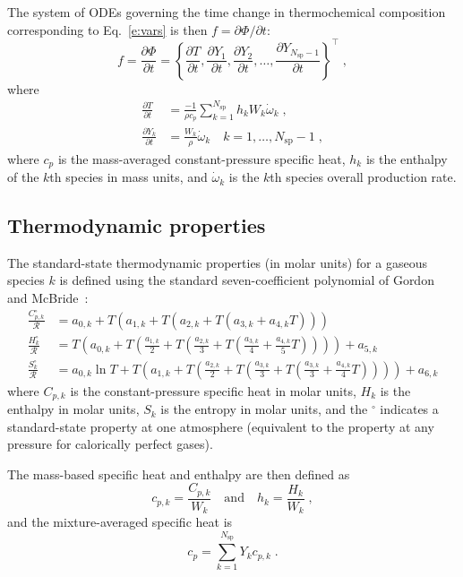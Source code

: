 \documentclass[preprint,12pt]{elsarticle}
\newcommand{ \ddt } [1] { \frac{ \partial #1 }{ \partial t } }
\newcommand{ \numsp }{N_{\text{sp}}}
\begin{document}
The system of ODEs governing the time change in thermochemical composition corresponding to Eq.~\eqref{e:vars} is then $ f = \partial \Phi/ \partial t$:
\begin{equation}
f = \ddt{\Phi} = \left \lbrace \ddt{T}, \ddt{Y_1}, \ddt{Y_2}, \dotsc, \ddt{Y_{\numsp - 1}} \right\rbrace^{\intercal} \;,
\label{e:ode}
\end{equation}
where
\begin{align}
\ddt{T} &= \frac{-1}{\rho c_p} \sum_{k=1}^{\numsp} h_k W_k \dot{\omega}_k \;, \\
\ddt{Y_k} &= \frac{W_k}{\rho} \dot{\omega}_k \quad k = 1, \dotsc, \numsp - 1 \;, \label{e:dTdt}
\end{align}
where $c_p$ is the mass-averaged constant-pressure specific heat, $h_k$ is the enthalpy of the $k$th species in mass units, and $\dot{\omega}_k$ is the $k$th species overall production rate.

\subsection{Thermodynamic properties}

The standard-state thermodynamic properties (in molar units) for a gaseous species $k$ is defined using the standard seven-coefficient polynomial of Gordon and McBride~\cite{Gordon:1976wp}:
\begin{align}
\frac{C_{p,k}^{\circ}}{\mathcal{R}} &= a_{0,k} + T \left( a_{1,k} + T \left( a_{2,k} + T \left( a_{3,k} + a_{4,k} T \right) \right) \right) \label{e:cpk} \\
\frac{H_k^{\circ}}{\mathcal{R}} &= T \left( a_{0,k} + T \left( \frac{a_{1,k}}{2} + T \left( \frac{a_{2,k}}{3} + T \left( \frac{a_{3,k}}{4} + \frac{a_{4,k}}{5} T \right) \right) \right) \right) + a_{5,k} \label{e:hk} \\
\frac{S_k^{\circ}}{\mathcal{R}} &= a_{0,k} \ln T + T \left( a_{1,k} + T \left( \frac{a_{2,k}}{2} + T \left( \frac{a_{3,k}}{3} + T \left( \frac{a_{3,k}}{3} + \frac{a_{4,k}}{4} T \right) \right) \right) \right) + a_{6,k} \label{e:sk}
\end{align}
where $C_{p,k}$ is the constant-pressure specific heat in molar units, $H_k$ is the enthalpy in molar units, $S_k$ is the entropy in molar units, and the ${}^{\circ}$ indicates a standard-state property at one atmosphere (equivalent to the property at any pressure for calorically perfect gases).

The mass-based specific heat and enthalpy are then defined as
\begin{equation}
c_{p,k} = \frac{C_{p,k}}{W_k} \quad \text{and} \quad h_k = \frac{H_k}{W_k} \;,
\end{equation}
and the mixture-averaged specific heat is
\begin{equation}
c_p = \sum_{k=1}^{\numsp} Y_k c_{p,k} \;.
\end{equation}
\end{document}
